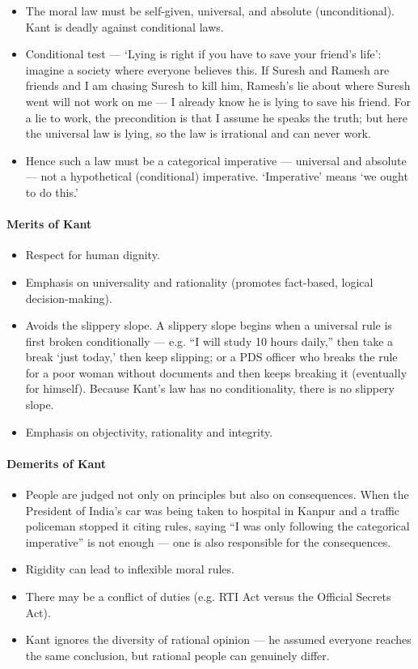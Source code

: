 \begin{KeyConcept}
\begin{itemize}
\item The moral law must be self-given, universal, and absolute (unconditional). Kant is deadly against conditional laws.
\item Conditional test --- `Lying is right if you have to save your friend's life': imagine a society where everyone believes this. If Suresh and Ramesh are friends and I am chasing Suresh to kill him, Ramesh's lie about where Suresh went will not work on me --- I already know he is lying to save his friend. For a lie to work, the precondition is that I assume he speaks the truth; but here the universal law is lying, so the law is irrational and can never work.
\item Hence such a law must be a categorical imperative --- universal and absolute --- not a hypothetical (conditional) imperative. `Imperative' means `we ought to do this.'
\end{itemize}
\end{KeyConcept}

\paragraph{Merits of Kant}
\begin{itemize}
\item Respect for human dignity.
\item Emphasis on universality and rationality (promotes fact-based, logical decision-making).
\item Avoids the slippery slope. A slippery slope begins when a universal rule is first broken conditionally --- e.g. ``I will study 10 hours daily,'' then take a break `just today,' then keep slipping; or a PDS officer who breaks the rule for a poor woman without documents and then keeps breaking it (eventually for himself). Because Kant's law has no conditionality, there is no slippery slope.
\item Emphasis on objectivity, rationality and integrity.
\end{itemize}

\paragraph{Demerits of Kant}
\begin{itemize}
\item People are judged not only on principles but also on consequences. When the President of India's car was being taken to hospital in Kanpur and a traffic policeman stopped it citing rules, saying ``I was only following the categorical imperative'' is not enough --- one is also responsible for the consequences.
\item Rigidity can lead to inflexible moral rules.
\item There may be a conflict of duties (e.g. RTI Act versus the Official Secrets Act).
\item Kant ignores the diversity of rational opinion --- he assumed everyone reaches the same conclusion, but rational people can genuinely differ.
\end{itemize}

